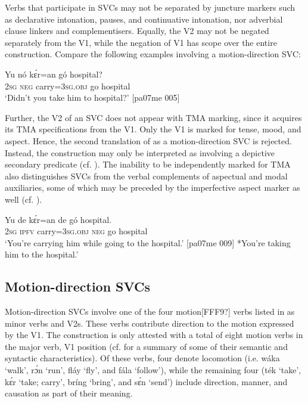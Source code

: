 Verbs that participate in SVCs may not be separated by juncture markers such as declarative intonation, pauses, and continuative intonation, nor adverbial clause linkers and complementisers. Equally, the V2 may not be negated separately from the V1, while the negation of V1 has scope over the entire construction. Compare the following examples involving a motion-direction SVC:



\z


\ea%
    \label{ex:key:1541}
    \gll Yu  nó  kɛ́r=an    gó  hospital?\\
\textsc{2sg}  \textsc{neg}  carry=\textsc{3sg.obj}  go  hospital\\
\glt ‘Didn’t you take him to hospital?’ [pa07me 005]
\z

Further, the V2 of an SVC does not appear with TMA marking, since it acquires its TMA specifications from the V1. Only the V1 is marked for tense, mood, and aspect. Hence, the second translation of  as a motion-direction SVC is rejected. Instead, the construction may only be interpreted as involving a depictive secondary predicate (cf. ). The inability to be independently marked for TMA also distinguishes SVCs from the verbal complements of aspectual and modal auxiliaries, some of which may be preceded by the imperfective aspect marker as well (cf. ). 


\ea%
    \label{ex:key:1542}
    \gll Yu  de  kɛ́r=an    de  gó  hospital.\\
\textsc{2sg}  \textsc{ipfv}  carry=\textsc{3sg.obj}  \textsc{neg}  go  hospital\\

\glt ‘You’re carrying him while going to the hospital.’ [pa07me 009]
*You’re taking him to the hospital.’
\z

\subsection{Motion-direction SVCs}\label{sec:11.2.1}

Motion-direction SVCs involve one of the four motion[FFF9?] verbs listed in  as minor verbs and V2s. These verbs contribute direction to the motion expressed by the V1. The construction is only attested with a total of eight motion verbs in the major verb, V1 position (cf.  for a summary of some of their semantic and syntactic characteristics). Of these verbs, four denote locomotion (i.e. wáka ‘walk’, rɔ́n ‘run’, fláy ‘fly’, and fála ‘follow’), while the remaining four (ték ‘take’, kɛ́r ‘take; carry’, bríng ‘bring’, and sɛ́n ‘send’) include direction, manner, and causation as part of their meaning. 



